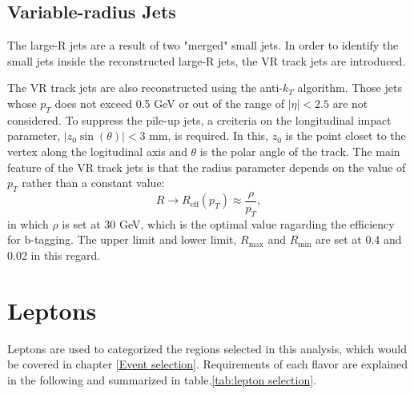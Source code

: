 \documentclass[class=NCU_thesis, crop=false]{standalone}
\begin{document}
	\subsection{Variable-radius Jets}\label{VR jets}
		The large-R jets are a result of two "merged" small jets. In order to identify the small jets inside the reconstructed large-R jets, the VR track jets are introduced.
	
		The VR track jets are also reconstructed using the anti-$k_T$ algorithm. Those jets whose $p_T$ does not exceed 0.5 GeV or out of the range of $\lvert \eta \rvert < 2.5$ are not considered. To suppress the pile-up jets, a creiteria on the longitudinal impact parameter, $\lvert z_0 \sin(\theta) \rvert < 3$ mm, is required. In this, $z_0$ is the point closet to the vertex along the logitudinal axis and $\theta$ is the polar angle of the track. The main feature of the VR track jets is that the radius parameter depends on the value of $p_T$ \cite{0903.0392} rather than a constant value:
		\begin{equation}
			R \rightarrow R_{\mathrm{eff}}(p_T) \approx \frac{\rho}{p_T},
		\end{equation}
		in which $\rho$ is set at 30 GeV, which is the optimal value ragarding the efficiency for b-tagging. The upper limit and lower limit, $R_{\mathrm{max}}$ and $R_{\mathrm{min}}$ are set at 0.4 and 0.02 in this regard.
	
\section{Leptons}
	Leptons are used to categorized the regions selected in this analysis, which would be covered in chapter \ref{Event selection}. Requirements of each flavor are explained in the following and summarized in table.\ref{tab:lepton selection}.
	
\end{document}
